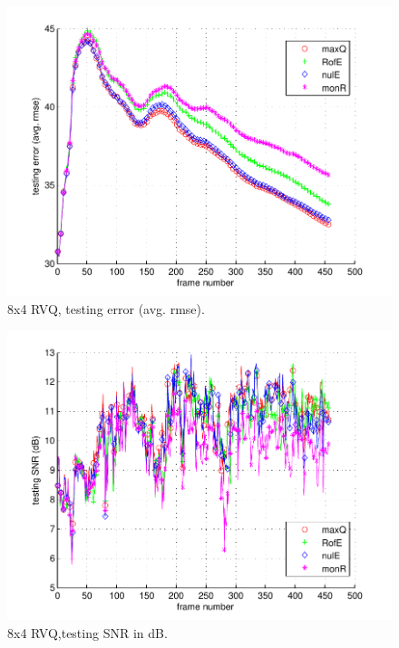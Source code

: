								\begin{figure}[h!]
								\centering
								\includegraphics[height=0.4\textheight]{thesis/2_davidin300_8_4_1000_tst_armse.pdf}
								\caption{8x4 RVQ, testing error (avg. rmse).}
								\label{fig:2_davidin300_8_4_1000_tst_armse}
								\end{figure}

								\begin{figure}[h!]
								\centering
								\includegraphics[height=0.4\textheight]{thesis/2_davidin300_8_4_1000_tst_SNRdB.pdf}
								\caption{8x4 RVQ,testing SNR in dB.}
								\label{fig:2_davidin300_8_4_1000_tst_SNRdB}
								\end{figure}
